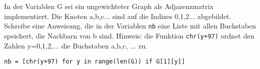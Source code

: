 ﻿\question[3]
In der Variablen G sei ein ungewichteter Graph als Adjazenzmatrix
implementiert.
Die Knoten a,b,c... sind auf die Indizes 0,1,2... abgebildet.
Schreibe eine Anweisung, die in der Variablen \texttt{nb} eine Liste mit
allen Buchstaben speichert, die Nachbarn von b sind.
Hinweis: die Funktion \texttt{chr(y+97)} ordnet den Zahlen y=0,1,2,... die Buchstaben
a,b,c, ... zu.

\begin{solutionbox}{2cm}
\begin{lstlisting}
nb = [chr(y+97) for y in range(len(G)) if G[1][y]]

\end{lstlisting}
\end{solutionbox}
